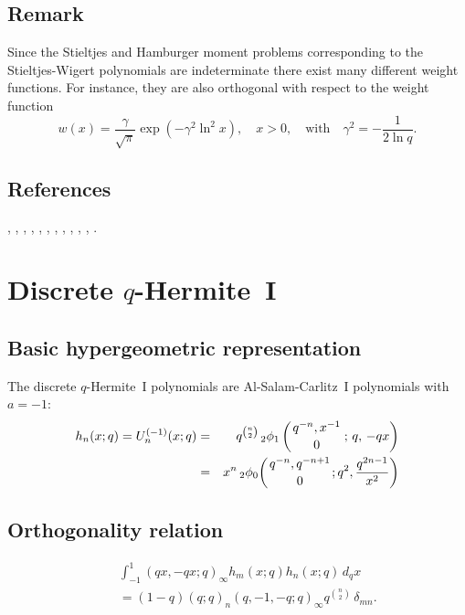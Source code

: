 \documentclass[envcountchap,graybox]{svmono}
\newcommand{\qhyp}[5]{\mbox{}_{#1}{\phi}_{#2}
\left(\genfrac{}{}{0pt}{}{#3}{#4}\,;\,q,\,#5\right)}
\newcommand{\qhypK}[5]{\,\mbox{}_{#1}\phi_{#2}\!\left(
  \genfrac{}{}{0pt}{}{#3}{#4};#5\right)}
\begin{document}
\subsection*{Remark} Since the Stieltjes and Hamburger moment problems corresponding
to the Stieltjes-Wigert polynomials are indeterminate there exist many
different weight functions. For instance, they are also orthogonal with
respect to the weight function
$$w(x)=\frac{\gamma}{\sqrt{\pi}}\exp\left(-\gamma^2\ln^2x\right),\quad x>0,\quad\textrm{with}\quad
\gamma^2=-\frac{1}{2\ln q}.$$

\subsection*{References}
\cite{Askey86}, \cite{Askey89I}, \cite{AtakAtakIII}, \cite{Chihara70}, \cite{Chihara78},
\cite{Dehesa}, \cite{Ismail2005I}, \cite{Nikiforov+}, \cite{Stieltjes}, \cite{Szego75},
\cite{ValentAssche}, \cite{Wigert}.


\section{Discrete $q$-Hermite~I}
\par\setcounter{equation}{0}

\subsection*{Basic hypergeometric representation}
The discrete $q$-Hermite~I polynomials are Al-Salam-Carlitz~I polynomials
with $a=-1$:
\begin{eqnarray}
\label{DefDiscreteqHermiteI}
h_n(x;q)=U_n^{(-1)}(x;q)&=&q^{\binom{n}{2}}\,\qhyp{2}{1}{q^{-n},x^{-1}}{0}{-qx}\\
&=&x^n\qhypK{2}{0}{q^{-n},q^{-n+1}}{0}{q^2,\frac{q^{2n-1}}{x^2}}\nonumber
\end{eqnarray}

\subsection*{Orthogonality relation}
\begin{eqnarray}
\label{OrtDiscreteqHermiteI}
& &\int_{-1}^1(qx,-qx;q)_{\infty}h_m(x;q)h_n(x;q)\,d_qx\nonumber\\
& &{}=(1-q)(q;q)_n(q,-1,-q;q)_{\infty}q^{\binom{n}{2}}\,\delta_{mn}.
\end{eqnarray}
\end{document}
